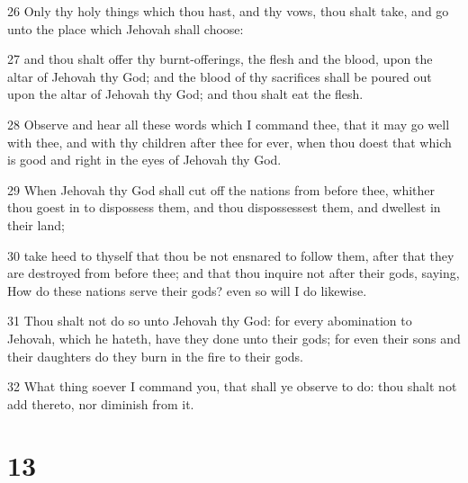 \par 26 Only thy holy things which thou hast, and thy vows, thou shalt take, and go unto the place which Jehovah shall choose:
\par 27 and thou shalt offer thy burnt-offerings, the flesh and the blood, upon the altar of Jehovah thy God; and the blood of thy sacrifices shall be poured out upon the altar of Jehovah thy God; and thou shalt eat the flesh.
\par 28 Observe and hear all these words which I command thee, that it may go well with thee, and with thy children after thee for ever, when thou doest that which is good and right in the eyes of Jehovah thy God.
\par 29 When Jehovah thy God shall cut off the nations from before thee, whither thou goest in to dispossess them, and thou dispossessest them, and dwellest in their land;
\par 30 take heed to thyself that thou be not ensnared to follow them, after that they are destroyed from before thee; and that thou inquire not after their gods, saying, How do these nations serve their gods? even so will I do likewise.
\par 31 Thou shalt not do so unto Jehovah thy God: for every abomination to Jehovah, which he hateth, have they done unto their gods; for even their sons and their daughters do they burn in the fire to their gods.
\par 32 What thing soever I command you, that shall ye observe to do: thou shalt not add thereto, nor diminish from it.

\chapter{13}

